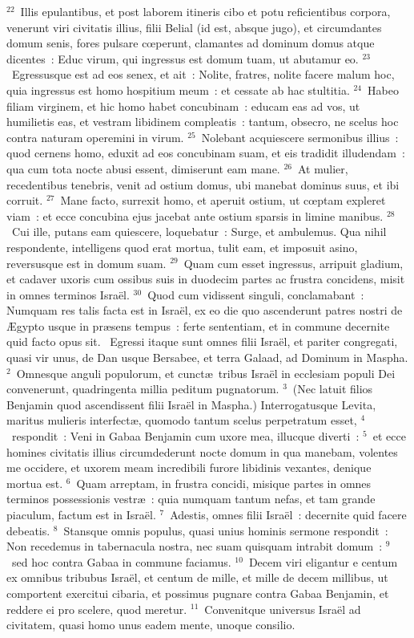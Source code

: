 ${}^{22}$~Illis epulantibus, et post laborem itineris cibo et potu reficientibus corpora, venerunt viri civitatis illius, filii Belial (id est, absque jugo), et circumdantes domum senis, fores pulsare cœperunt, clamantes ad dominum domus atque dicentes~: Educ virum, qui ingressus est domum tuam, ut abutamur eo.
${}^{23}$~Egressusque est ad eos senex, et ait~: Nolite, fratres, nolite facere malum hoc, quia ingressus est homo hospitium meum~: et cessate ab hac stultitia.
${}^{24}$~Habeo filiam virginem, et hic homo habet concubinam~: educam eas ad vos, ut humilietis eas, et vestram libidinem compleatis~: tantum, obsecro, ne scelus hoc contra naturam operemini in virum.
${}^{25}$~Nolebant acquiescere sermonibus illius~: quod cernens homo, eduxit ad eos concubinam suam, et eis tradidit illudendam~: qua cum tota nocte abusi essent, dimiserunt eam mane.
${}^{26}$~At mulier, recedentibus tenebris, venit ad ostium domus, ubi manebat dominus suus, et ibi corruit.
${}^{27}$~Mane facto, surrexit homo, et aperuit ostium, ut cœptam expleret viam~: et ecce concubina ejus jacebat ante ostium sparsis in limine manibus.
${}^{28}$~Cui ille, putans eam quiescere, loquebatur~: Surge, et ambulemus. Qua nihil respondente, intelligens quod erat mortua, tulit eam, et imposuit asino, reversusque est in domum suam.
${}^{29}$~Quam cum esset ingressus, arripuit gladium, et cadaver uxoris cum ossibus suis in duodecim partes ac frustra concidens, misit in omnes terminos Isra\"el.
${}^{30}$~Quod cum vidissent singuli, conclamabant~: Numquam res talis facta est in Isra\"el, ex eo die quo ascenderunt patres nostri de \AE gypto usque in pr\ae sens tempus~: ferte sententiam, et in commune decernite quid facto opus sit.
~Egressi itaque sunt omnes filii Isra\"el, et pariter congregati, quasi vir unus, de Dan usque Bersabee, et terra Galaad, ad Dominum in Maspha.
${}^{2}$~Omnesque anguli populorum, et cunct\ae\ tribus Isra\"el in ecclesiam populi Dei convenerunt, quadringenta millia peditum pugnatorum.
${}^{3}$~(Nec latuit filios Benjamin quod ascendissent filii Isra\"el in Maspha.) Interrogatusque Levita, maritus mulieris interfect\ae , quomodo tantum scelus perpetratum esset,
${}^{4}$~respondit~: Veni in Gabaa Benjamin cum uxore mea, illucque diverti~:
${}^{5}$~et ecce homines civitatis illius circumdederunt nocte domum in qua manebam, volentes me occidere, et uxorem meam incredibili furore libidinis vexantes, denique mortua est.
${}^{6}$~Quam arreptam, in frustra concidi, misique partes in omnes terminos possessionis vestr\ae~: quia numquam tantum nefas, et tam grande piaculum, factum est in Isra\"el.
${}^{7}$~Adestis, omnes filii Isra\"el~: decernite quid facere debeatis.
${}^{8}$~Stansque omnis populus, quasi unius hominis sermone respondit~: Non recedemus in tabernacula nostra, nec suam quisquam intrabit domum~:
${}^{9}$~sed hoc contra Gabaa in commune faciamus.
${}^{10}$~Decem viri eligantur e centum ex omnibus tribubus Isra\"el, et centum de mille, et mille de decem millibus, ut comportent exercitui cibaria, et possimus pugnare contra Gabaa Benjamin, et reddere ei pro scelere, quod meretur.
${}^{11}$~Convenitque universus Isra\"el ad civitatem, quasi homo unus eadem mente, unoque consilio.


